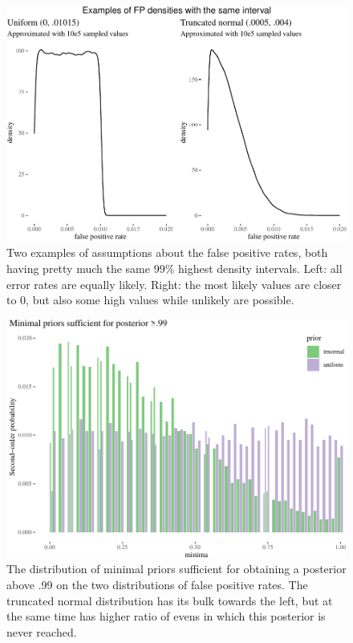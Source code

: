 \documentclass[
  10pt,
  dvipsnames,enabledeprecatedfontcommands]{scrartcl}
\begin{document}
\begin{figure}[H]



\begin{center}\includegraphics[width=0.8\linewidth]{paper-outline_files/figure-latex/fig:fppdistros-1} \end{center}


\caption{Two examples of assumptions about the false positive rates, both having pretty much the same 99\% highest density intervals. Left: all error rates are equally likely. Right: the most likely values are closer to 0, but also some high values while unlikely are possible.}

\label{fig:fppdistros}

\end{figure}

\begin{figure}[H]



\begin{center}\includegraphics[width=0.8\linewidth]{paper-outline_files/figure-latex/fig:fppMinima-1} \end{center}


\caption{The distribution of minimal priors sufficient for obtaining a posterior above .99 on the two distributions of false positive rates. The truncated normal distribution has its bulk towards the left, but at the same time has higher ratio of evens in which this posterior is never reached. }

\label{fig:fppMinima}

\end{figure}
\end{document}
